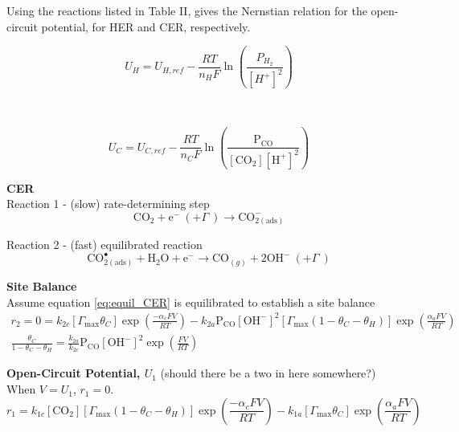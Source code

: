 \documentclass[12pt]{article}
\begin{document}
  Using the reactions listed in Table II, gives the Nernstian relation for the open-circuit potential, for HER and CER, respectively.
  \begin{center}
  \end{center}

  \begin{equation}
    U_H = U_{H,ref} - \frac{RT}{n_H F} \ln{ \left( \frac{P_{H_2}}{[H^+]^2}  \right)}
  \end{equation}


  \hfill \\
  \begin{center}
  \end{center}

  \begin{equation}
    U_C = U_{C,ref} - \frac{RT}{n_C F} \ln{ \left( \frac{\text{P}_{\text{CO}}}{[\text{CO}_2][\text{H}^+]^2} \right)}
  \end{equation}

  \clearpage
  \clearpage
  \textbf{CER}\\
  Reaction 1 - (slow) rate-determining step
  \begin{equation*}
    \text{CO}_2 + \text{e}^- \ (+ \Gamma \ ) \rightarrow \text{CO}^-_{2(\text{ads})}
  \end{equation*}

  Reaction 2 - (fast) equilibrated reaction
  \begin{equation*}
    \text{CO}_{2(\text{ads})}^{\bullet} + \text{H}_2\text{O} + \text{e}^- \rightarrow \text{CO}_{(g)} + 2\text{OH}^- \ (+ \Gamma \ )
  \end{equation*}

  \textbf{Site Balance}\\
  Assume equation \ref{eq:equil_CER} is equilibrated to establish a site balance
  \begin{gather*}
    r_2 = 0 = k_{2c} \left[\Gamma_{\max} \theta_C \right] \exp{ \left( \frac{-\alpha_c F V}{RT} \right)}
    - k_{2a} \text{P}_{\text{CO}} \left[\text{OH}^- \right]^2
    \left[\Gamma_{\max} (1 - \theta_C - \theta_H) \right]
    \exp{ \left( \frac{\alpha_a F V}{RT} \right)}
    \\
    \frac{\theta_C}{1 - \theta_C - \theta_H} = \frac{k_{2a}}{k_{2c}} \text{P}_{\text{CO}} \left[\text{OH}^- \right]^2 \exp{ \left( \frac{F V}{RT} \right)}
  \end{gather*}

  \textbf{Open-Circuit Potential, $U_1$} (should there be a two in here somewhere?)\\
  When $V = U_1$, $r_1 = 0$.
  \begin{equation*}
    r_1 = k_{1c} [{\text{CO}_2}] \left[\Gamma_{\max} (1 - \theta_C - \theta_H) \right] \exp{ \left( \frac{-\alpha_c F V}{RT} \right)}
    - k_{1a} \left[\Gamma_{\max} \theta_C \right] \exp{\left( \frac{\alpha_a F V}{RT} \right)}
  \end{equation*}
\end{document}
